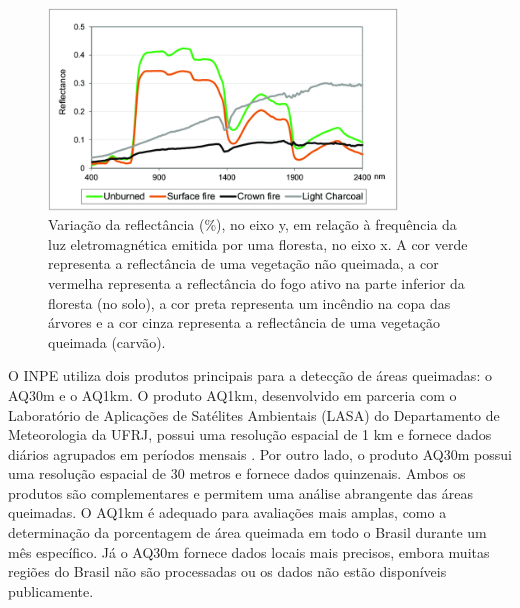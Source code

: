 \documentclass[cic,tc]{iiufrgs}
\begin{document}
\begin{figure}[!htb]
    \caption{Variação da reflectância (\%), no eixo y, em relação à frequência da luz eletromagnética emitida por uma floresta, no eixo x. A cor verde representa a reflectância de uma vegetação não queimada, a cor vermelha representa a reflectância do fogo ativo na parte inferior da floresta (no solo), a cor preta representa um incêndio na copa das árvores e a cor cinza representa a reflectância de uma vegetação queimada (carvão).}
    \begin{center}
        \includegraphics[width=25em]{Reflectance-spectra-for-unburned-vegetation-canopy-and-fires-affecting-different}
    \end{center}
    \label{fig:reflectancia_espectral}
\end{figure}

O INPE utiliza dois produtos principais para a detecção de áreas queimadas: o AQ30m e o AQ1km. O produto AQ1km, desenvolvido em parceria com o Laboratório de Aplicações de Satélites Ambientais (LASA) do Departamento de Meteorologia da UFRJ, possui uma resolução espacial de 1 km e fornece dados diários agrupados em períodos mensais \citep{SiteAQ1km}. Por outro lado, o produto AQ30m possui uma resolução espacial de 30 metros e fornece dados quinzenais. Ambos os produtos são complementares e permitem uma análise abrangente das áreas queimadas. O AQ1km é adequado para avaliações mais amplas, como a determinação da porcentagem de área queimada em todo o Brasil durante um mês específico. Já o AQ30m fornece dados locais mais precisos, embora muitas regiões do Brasil não são processadas ou os dados não estão disponíveis publicamente.
\end{document}
